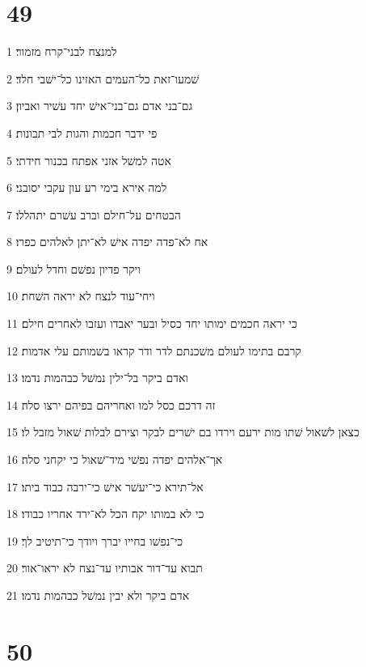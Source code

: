 \chapter{49}

\par 1 למנצח לבני־קרח מזמור׃
\par 2 שׁמעו־זאת כל־העמים האזינו כל־ישׁבי חלד׃
\par 3 גם־בני אדם גם־בני־אישׁ יחד עשׁיר ואביון׃
\par 4 פי ידבר חכמות והגות לבי תבונות׃
\par 5 אטה למשׁל אזני אפתח בכנור חידתי׃
\par 6 למה אירא בימי רע עון עקבי יסובני׃
\par 7 הבטחים על־חילם וברב עשׁרם יתהללו׃
\par 8 אח לא־פדה יפדה אישׁ לא־יתן לאלהים כפרו׃
\par 9 ויקר פדיון נפשׁם וחדל לעולם׃
\par 10 ויחי־עוד לנצח לא יראה השׁחת׃
\par 11 כי יראה חכמים ימותו יחד כסיל ובער יאבדו ועזבו לאחרים חילם׃
\par 12 קרבם בתימו לעולם משׁכנתם לדר ודר קראו בשׁמותם עלי אדמות׃
\par 13 ואדם ביקר בל־ילין נמשׁל כבהמות נדמו׃
\par 14 זה דרכם כסל למו ואחריהם בפיהם ירצו סלה׃
\par 15 כצאן לשׁאול שׁתו מות ירעם וירדו בם ישׁרים לבקר וצירם לבלות שׁאול מזבל לו׃
\par 16 אך־אלהים יפדה נפשׁי מיד־שׁאול כי יקחני סלה׃
\par 17 אל־תירא כי־יעשׁר אישׁ כי־ירבה כבוד ביתו׃
\par 18 כי לא במותו יקח הכל לא־ירד אחריו כבודו׃
\par 19 כי־נפשׁו בחייו יברך ויודך כי־תיטיב לך׃
\par 20 תבוא עד־דור אבותיו עד־נצח לא יראו־אור׃
\par 21 אדם ביקר ולא יבין נמשׁל כבהמות נדמו׃

\chapter{50}

